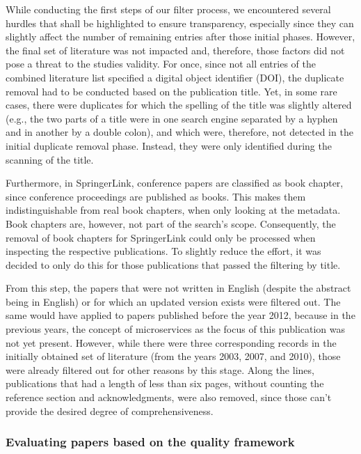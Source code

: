 \documentclass[conference]{IEEEtran}
\begin{document}
While conducting the first steps of our filter process, we encountered several hurdles that shall be highlighted to ensure transparency, especially since they can slightly affect the number of remaining entries after those initial phases. However, the final set of literature was not impacted and, therefore, those factors did not pose a threat to the studies validity. For once, since not all entries of the combined literature list specified a digital object identifier (DOI), the duplicate removal had to be conducted based on the publication title. Yet, in some rare cases, there were duplicates for which the spelling of the title was slightly altered (e.g., the two parts of a title were in one search engine separated by a hyphen and in another by a double colon), and which were, therefore, not detected in the initial duplicate removal phase. Instead, they were only identified during the scanning of the title. 

Furthermore, in SpringerLink, conference papers are classified as book chapter, since conference proceedings are published as books. This makes them indistinguishable from real book chapters, when only looking at the metadata. Book chapters are, however, not part of the search’s scope. Consequently, the removal of book chapters for SpringerLink could only be processed when inspecting the respective publications. To slightly reduce the effort, it was decided to only do this for those publications that passed the filtering by title.

From this step, the papers that were not written in English (despite the abstract being in English) or for which an updated version exists were filtered out. The same would have applied to papers published before the year 2012, because in the previous years, the concept of microservices as the focus of this publication was not yet present. However, while there were three corresponding records in the initially obtained set of literature (from the years 2003, 2007, and 2010), those were already filtered out for other reasons by this stage. Along the lines, publications that had a length of less than six pages, without counting the reference section and acknowledgments, were also removed, since those can’t provide the desired degree of comprehensiveness. 

\subsubsection{Evaluating papers based on the quality framework}
\end{document}

